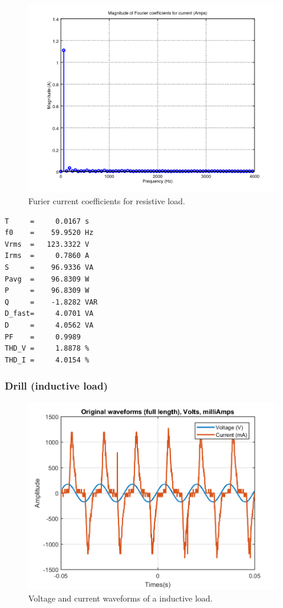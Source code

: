 \documentclass[journal]{IEEEtran}
\begin{document}
\begin{figure}[h]
\centering
\includegraphics[clip,width=\columnwidth]
{zoomed_current_furier_coefficients_resistive.png}
\caption{Furier current coefficients for resistive load.}
\label{fourier_corrent_coefficients_resistive}
\end{figure}

\begin{lstlisting}[caption = Output for resistive load.]
T     =     0.0167 s 
f0    =    59.9520 Hz 
Vrms  =   123.3322 V
Irms  =     0.7860 A
S     =    96.9336 VA
Pavg  =    96.8309 W 
P     =    96.8309 W 
Q     =    -1.8282 VAR 
D_fast=     4.0701 VA 
D     =     4.0562 VA 
PF    =     0.9989 
THD_V =     1.8878 %
THD_I =     4.0154 %
\end{lstlisting}


\subsubsection{Drill (inductive load)}

\begin{figure}[h]
\centering
\includegraphics[clip,width=\columnwidth]
{original_waveform_drill.png}
\caption{Voltage and current waveforms of a inductive load.}
\label{original_inductive_load}
\end{figure}
\end{document}
